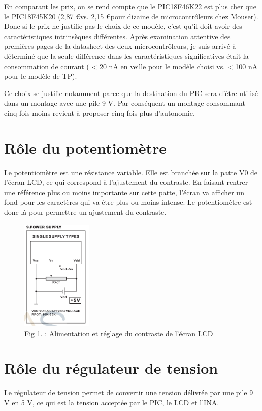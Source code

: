 \documentclass[a4paper,11pt,titlepage]{article}
\begin{document}
En comparant les prix, on se rend compte que le PIC18F46K22 est plus cher que le PIC18F45K20 (2,87 \euro  vs. 2,15 \euro  pour dizaine de microcontrôleurs chez Mouser). Donc si le prix ne justifie pas le choix de ce modèle, c'est qu'il doit avoir des caractéristiques intrinsèques différentes. Après examination attentive des premières pages de la datasheet des deux microcontrôleurs, je suis arrivé à déterminé que la seule différence dans les caractéristiques significatives était la consommation de courant ( < 20 nA en veille pour le modèle choisi vs. < 100 nA pour le modèle de TP).

Ce choix se justifie notamment parce que la destination du PIC sera d'être utilisé dans un montage avec une pile 9 V. Par conséquent un montage consommant cinq fois moins revient à proposer cinq fois plus d'autonomie. 

\section{Rôle du potentiomètre}
Le potentiomètre est une résistance variable. Elle est branchée sur la patte V0 de l'écran LCD, ce qui correspond à l'ajustement du contraste. En faisant rentrer une référence plus ou moins importante sur cette patte, l'écran va afficher un fond pour les caractères qui va être plus ou moins intense. Le potentiomètre est donc là pour permettre un ajustement du contraste.

\begin{figure}[h]
  \begin{center}
    \includegraphics[width=0.3\textwidth]{img/LCD_Supply.png}
    \caption{Fig 1. : Alimentation et réglage du contraste de l'écran LCD}
    \label{fig:}
  \end{center}
\end{figure}


\section{Rôle du régulateur de tension}
Le régulateur de tension permet de convertir une tension délivrée par une pile 9 V en 5 V, ce qui est la tension acceptée par le PIC, le LCD et l'INA.
\end{document}
